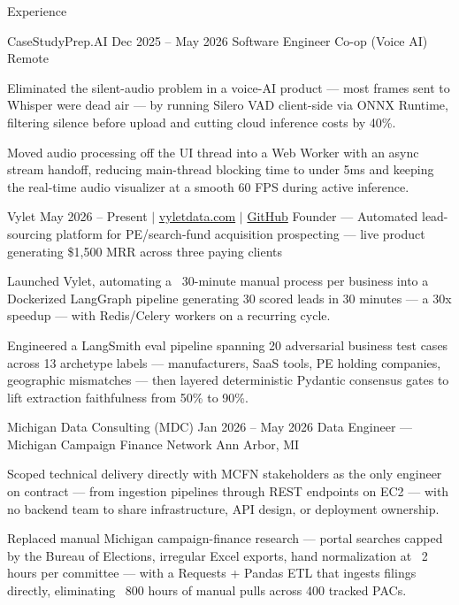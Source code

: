 \documentclass[
	11pt
]{../../../template}
\begin{document}
	\begin{rSection}{E}{xperience}
		\begin{rSectionEntry}
			{CaseStudyPrep.AI}
			{Dec 2025 -- May 2026}
			{Software Engineer Co-op (Voice AI)}
			{}
			{Remote}

			\item Eliminated the silent-audio problem in a voice-AI product --- most frames sent to Whisper were dead air --- by running Silero VAD client-side via ONNX Runtime, filtering silence before upload and cutting cloud inference costs by 40\%.
			\item Moved audio processing off the UI thread into a Web Worker with an async stream handoff, reducing main-thread blocking time to under 5ms and keeping the real-time audio visualizer at a smooth 60 FPS during active inference.
		\end{rSectionEntry}

		\begin{rSectionEntry}
			{Vylet}
			{May 2026 -- Present $\vert$ \href{https://vyletdata.com}{vyletdata.com} $\vert$ \href{https://github.com/Verdent06/Lead-Gen-Agentic-Pipeline}{GitHub}}
			{Founder --- Automated lead-sourcing platform for PE/search-fund acquisition prospecting --- live product generating \$1,500 MRR across three paying clients}
			{}
			{}

			\item Launched Vylet, automating a ~30-minute manual process per business into a Dockerized LangGraph pipeline generating 30 scored leads in 30 minutes --- a 30x speedup --- with Redis/Celery workers on a recurring cycle.
			\item Engineered a LangSmith eval pipeline spanning 20 adversarial business test cases across 13 archetype labels --- manufacturers, SaaS tools, PE holding companies, geographic mismatches --- then layered deterministic Pydantic consensus gates to lift extraction faithfulness from 50\% to 90\%.
		\end{rSectionEntry}

		\begin{rSectionEntry}
			{Michigan Data Consulting (MDC)}
			{Jan 2026 -- May 2026}
			{Data Engineer --- Michigan Campaign Finance Network}
			{}
			{Ann Arbor, MI}

			\item Scoped technical delivery directly with MCFN stakeholders as the only engineer on contract --- from ingestion pipelines through REST endpoints on EC2 --- with no backend team to share infrastructure, API design, or deployment ownership.
			\item Replaced manual Michigan campaign-finance research --- portal searches capped by the Bureau of Elections, irregular Excel exports, hand normalization at ~2 hours per committee --- with a Requests + Pandas ETL that ingests filings directly, eliminating ~800 hours of manual pulls across 400 tracked PACs.
		\end{rSectionEntry}
	\end{rSection}
\end{document}
